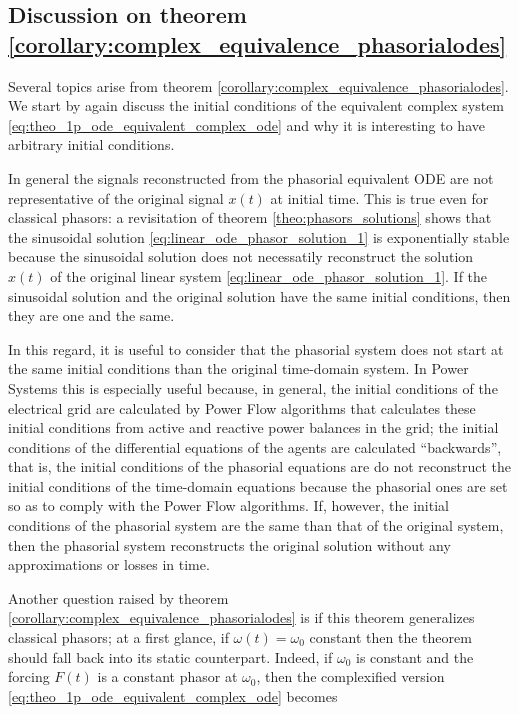 \subsection{Discussion on theorem \ref{corollary:complex_equivalence_phasorialodes}}\label{subsec:discussion_complexification} %

	Several topics arise from theorem \ref{corollary:complex_equivalence_phasorialodes}. We start by again discuss the initial conditions of the equivalent complex system \eqref{eq:theo_1p_ode_equivalent_complex_ode} and why it is interesting to have arbitrary initial conditions. 

	In general the signals reconstructed from the phasorial equivalent ODE are not representative of the original signal $x(t)$ at initial time. This is true even for classical phasors: a revisitation of theorem \ref{theo:phasors_solutions} shows that the sinusoidal solution \eqref{eq:linear_ode_phasor_solution_1} is exponentially stable because the sinusoidal solution does not necessatily reconstruct the solution $x(t)$ of the original linear system \eqref{eq:linear_ode_phasor_solution_1}. If the sinusoidal solution and the original solution have the same initial conditions, then they are one and the same.

	In this regard, it is useful to consider that the phasorial system does not start at the same initial conditions than the original time-domain system. In Power Systems this is especially useful because, in general, the initial conditions of the electrical grid are calculated by Power Flow algorithms that calculates these initial conditions from active and reactive power balances in the grid; the initial conditions of the differential equations of the agents are calculated ``backwards'', that is, the initial conditions of the phasorial equations are do not reconstruct the initial conditions of the time-domain equations because the phasorial ones are set so as to comply with the Power Flow algorithms. If, however, the initial conditions of the phasorial system are the same than that of the original system, then the phasorial system reconstructs the original solution without any approximations or losses in time.

	Another question raised by theorem \ref{corollary:complex_equivalence_phasorialodes} is if this theorem generalizes classical phasors; at a first glance, if $\omega(t) = \omega_0$ constant then the theorem should fall back into its static counterpart. Indeed, if $\omega_0$ is constant and the forcing $F(t)$ is a constant phasor at $\omega_0$, then the complexified version \eqref{eq:theo_1p_ode_equivalent_complex_ode} becomes

